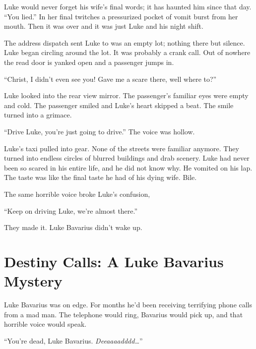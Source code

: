 Luke would never forget his wife's final words; it has
haunted him since that day. ``You lied.'' In her final
twitches a pressurized pocket of vomit burst from her mouth. Then
it was over and it was just Luke and his night shift.



The address dispatch sent Luke to was an empty lot; nothing there
but silence. Luke began circling around the lot. It was probably a
crank call. Out of nowhere the read door is yanked open and a
passenger jumps in.

``Christ, I didn't even see you! Gave me a scare there,
well where to?''

Luke looked into the rear view mirror. The passenger's
familiar eyes were empty and cold. The passenger smiled and
Luke's heart skipped a beat. The smile turned into a
grimace.



``Drive Luke, you're just going to drive.'' The
voice was hollow.



Luke's taxi pulled into gear. None of the streets were
familiar anymore. They turned into endless circles of blurred
buildings and drab scenery. Luke had never been so scared in his
entire life, and he did not know why. He vomited on his lap. The
taste was like the final taste he had of his dying wife.
Bile.



The same horrible voice broke Luke's confusion,

``Keep on driving Luke, we're almost there.''



They made it. Luke Bavarius didn't wake up. 

 





\chapter[Destiny Calls]{Destiny Calls: A Luke Bavarius Mystery}



Luke Bavarius was on edge. For months he'd been receiving
terrifying phone calls from a mad man. The telephone would ring,
Bavarius would pick up, and that horrible voice would speak.



``You're dead, Luke Bavarius. {\em Deeaaaadddd{\ldots}}''



